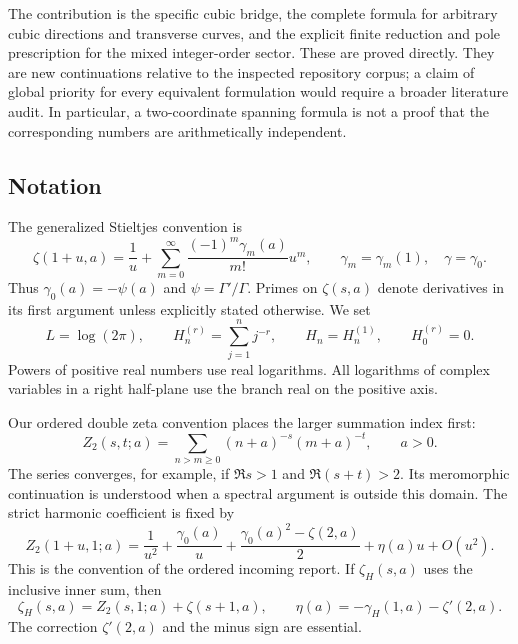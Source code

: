 \documentclass[11pt]{article}
\numberwithin{equation}{section}
\theoremstyle{definition}
\theoremstyle{remark}
\begin{document}
The contribution is the specific cubic bridge, the complete formula
for arbitrary cubic directions and transverse curves, and the explicit
finite reduction and pole prescription for the mixed integer-order
sector. These are proved directly. They are new continuations relative
to the inspected repository corpus; a claim of global priority for
every equivalent formulation would require a broader literature audit.
In particular, a two-coordinate spanning formula is not a proof that
the corresponding numbers are arithmetically independent.

\subsection{Notation}

The generalized Stieltjes convention is
\begin{equation}\label{eq:stieltjes}
 \zeta(1+u,a)=\frac1u+
       \sum_{m=0}^{\infty}\frac{(-1)^m\gamma_m(a)}{m!}u^m,
 \qquad \gamma_m=\gamma_m(1),\quad \gamma=\gamma_0.
\end{equation}
Thus $\gamma_0(a)=-\psi(a)$ and $\psi=\Gamma'/\Gamma$.
Primes on $\zeta(s,a)$ denote derivatives in its first argument unless
explicitly stated otherwise. We set
\[
 L=\log(2\pi),\qquad
 H_n^{(r)}=\sum_{j=1}^n j^{-r},\qquad H_n=H_n^{(1)},\qquad H_0^{(r)}=0.
\]
Powers of positive real numbers use real logarithms. All logarithms
of complex variables in a right half-plane use the branch real on
the positive axis.

Our ordered double zeta convention places the larger summation index
first:
\begin{equation}\label{eq:Z2def}
 Z_2(s,t;a)=\sum_{n>m\ge0}(n+a)^{-s}(m+a)^{-t},\qquad a>0.
\end{equation}
The series converges, for example, if $\Re s>1$ and
$\Re(s+t)>2$. Its meromorphic continuation is understood when a
spectral argument is outside this domain. The strict harmonic coefficient
is fixed by
\begin{equation}\label{eq:eta-definition}
 Z_2(1+u,1;a)=\frac1{u^2}+\frac{\gamma_0(a)}u+
 \frac{\gamma_0(a)^2-\zeta(2,a)}2+\eta(a)u+O(u^2).
\end{equation}
This is the convention of the ordered incoming report. If
$\zeta_H(s,a)$ uses the inclusive inner sum, then
\begin{equation}\label{eq:strict-inclusive}
 \zeta_H(s,a)=Z_2(s,1;a)+\zeta(s+1,a),\qquad
 \eta(a)=-\gamma_H(1,a)-\zeta'(2,a).
\end{equation}
The correction $\zeta'(2,a)$ and the minus sign are essential.
\end{document}
